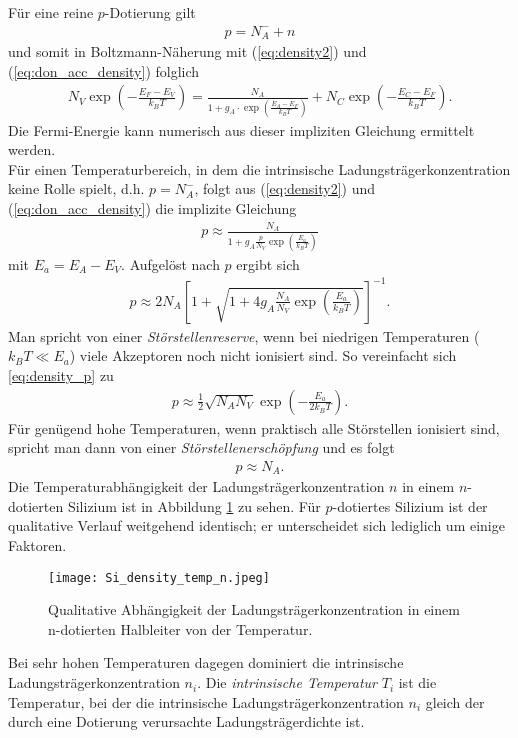 Für eine reine $p$-Dotierung gilt
\begin{align}
p=N_A^{-}+n
\end{align}
und somit in Boltzmann-Näherung mit (\ref{eq:density2}) und (\ref{eq:don_acc_density}) folglich
\begin{align}
N_V\exp\left(-\frac{E_F-E_V}{k_B T}\right)=\frac{N_A}{1+g_A\cdot\exp\left(\frac{E_A-E_F}{k_B T}\right)}+N_C\exp\left(-\frac{E_C-E_F}{k_B T}\right).
\end{align}
Die Fermi-Energie kann numerisch aus dieser impliziten Gleichung ermittelt werden.\\
Für einen Temperaturbereich, in dem die intrinsische Ladungsträgerkonzentration keine Rolle spielt, d.h. $p=N_A^{-}$, folgt aus (\ref{eq:density2}) und (\ref{eq:don_acc_density}) die implizite Gleichung
\begin{align}
p\approx\frac{N_A}{1+g_A\frac{p}{N_V}\exp\left(\frac{E_a}{k_B T}\right)}
\end{align}
mit $E_a=E_A-E_V$. Aufgelöst nach $p$ ergibt sich
\begin{align}
p\approx 2N_A\left[1+\sqrt{1+4g_A\frac{N_A}{N_V}\exp\left(\frac{E_a}{k_B T}\right)}\right]^{-1}.
\label{eq:density_p}
\end{align}
Man spricht von einer \emph{Störstellenreserve}, wenn bei niedrigen Temperaturen ($k_B T\ll E_a$) viele Akzeptoren noch nicht ionisiert sind. So vereinfacht sich \eqref{eq:density_p} zu
\begin{align}
p\approx \frac{1}{2}\sqrt{N_A N_V}\exp\left(-\frac{E_a}{2k_B T}\right).
\label{eq:p_approx}
\end{align}
Für genügend hohe Temperaturen, wenn praktisch alle Störstellen ionisiert sind, spricht man dann von einer \emph{Störstellenerschöpfung} und es folgt
\begin{align}
p\approx N_A.
\end{align}
Die Temperaturabhängigkeit der Ladungsträgerkonzentration $n$ in einem $n$-dotierten Silizium ist in Abbildung \ref{fig:si_density_temp} zu sehen. Für $p$-dotiertes Silizium ist der qualitative Verlauf weitgehend identisch; er unterscheidet sich lediglich um einige Faktoren.
\begin{figure}[p]
\centering
\texttt{[image: Si\_density\_temp\_n.jpeg]}
\caption{Qualitative Abhängigkeit der Ladungsträgerkonzentration in einem n-dotierten Halbleiter von der Temperatur. \cite{lit:GroMa14}}
\label{fig:si_density_temp}
\end{figure}
Bei sehr hohen Temperaturen dagegen dominiert die intrinsische Ladungsträgerkonzentration $n_i$. Die \emph{intrinsische Temperatur} $T_i$ ist die Temperatur, bei der die intrinsische Ladungsträgerkonzentration $n_i$ gleich der durch eine Dotierung verursachte Ladungsträgerdichte ist. %
